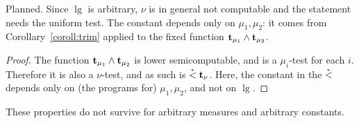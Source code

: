 \begin{formalization}
Planned. Since $\lg$ is arbitrary, $\nu$ is in general not computable and the statement needs the
uniform test. The constant depends only on $\mu_{1},\mu_{2}$: it comes from
Corollary~\ref{coroll:trim} applied to the fixed function $\mathbf{t}_{\mu_{1}}\land\mathbf{t}_{\mu_{2}}$.
\end{formalization}
  \begin{proof}
 The function \( \mathbf{t}_{\mu_{1}}\land\mathbf{t}_{\mu_{2}} \) 
is lower semicomputable, and is a \( \mu_{i} \)-test for each \( i \).
Therefore it is also a \( \nu \)-test, and as such is \( \stackrel{{}_*}{<}\mathbf{t}_{\nu} \).
Here, the constant in the \( \stackrel{{}_*}{<} \) depends only on (the programs for)
\( \mu_{1},\mu_{2} \), and not on \( \lg \).
  \end{proof}

 These properties do not survive for arbitrary measures and arbitrary constants.

